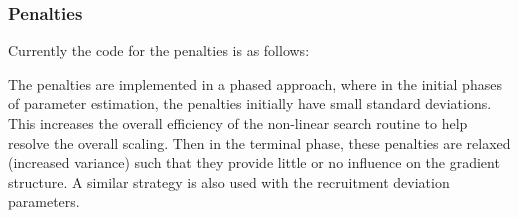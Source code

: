 \documentclass[12pt,letterpaper]{article}
\begin{document}
    \subsubsection{Penalties} %
    \label{ssub:penalties}
    Currently the code for the penalties is as follows:
    

    The penalties are implemented in a phased approach, where in the initial phases of parameter estimation, the penalties initially have small standard deviations. This increases the overall efficiency of the non-linear search routine to help resolve the overall scaling. Then in the terminal phase, these penalties are relaxed (increased variance) such that they provide little or no influence on the gradient structure.  A similar strategy is also used with the recruitment deviation parameters.
\end{document}
